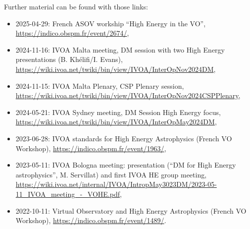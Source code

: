 \documentclass[11pt,a4paper]{ivoa}
\begin{document}
Further material can be found with those links:
\begin{itemize}
    \item 2025-04-29: French ASOV workship ``High Energy in the VO'', \url{https://indico.obspm.fr/event/2674/},
    \item 2024-11-16: IVOA Malta meeting, DM session with two High Energy presentations (B. Kh\'elifi/I. Evans), \url{https://wiki.ivoa.net/twiki/bin/view/IVOA/InterOpNov2024DM},
    \item 2024-11-15: IVOA Malta Plenary, CSP Plenary session, \url{https://wiki.ivoa.net/twiki/bin/view/IVOA/InterOpNov2024CSPPlenary},
    \item 2024-05-21: IVOA Sydney meeting, DM Session High Energy focus, \url{https://wiki.ivoa.net/twiki/bin/view/IVOA/InterOpMay2024DM},
    \item 2023-06-28: IVOA standards for High Energy Astrophysics (French VO Workshop), \url{https://indico.obspm.fr/event/1963/},
    \item 2023-05-11: IVOA Bologna meeting: presentation (``DM for High Energy astrophysics'', M. Servillat) and first IVOA HE group meeting, \url{https://wiki.ivoa.net/internal/IVOA/IntropMay3023DM/2023-05-11_IVOA_meeting_-_VOHE.pdf},
    \item 2022-10-11: Virtual Observatory and High Energy Astrophysics (French VO Workshop), \url{https://indico.obspm.fr/event/1489/}.
\end{itemize}

\end{document}
